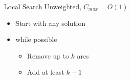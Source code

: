 \begin{frame}{Local Search}
Unweighted, $C_{max} = O(1)$
\begin{itemize}
  \item Start with any solution
  \item while possible
  	\begin{itemize}
  	  \item Remove up to $k$ arcs
  	  \item Add at least $k+1$
	\end{itemize}
\end{itemize}
\end{frame}